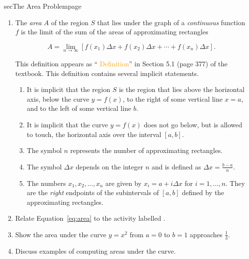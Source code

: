 \documentclass[../main]{subfiles}
\begin{document}
\begin{outline}{sec}{The Area Problem}{page}
\begin{enumerate}
    \item {The \emph{area} \(A\) of the region \(S\) that lies under the graph of a \emph{continuous} function \(f\) is the limit of the sum of the areas of approximating rectangles}
        \begin{mdframed}[style=simple]
          \begin{equation} \label{eq:area}
            A = \lim_{n \to \infty} \left[ f(x_{1}) \Delta x + f(x_{2}) \Delta x + \cdots + f(x_{n}) \Delta x \right].
          \end{equation}
        \end{mdframed}
        This definition appears as ``\textcolor{orange}{ Definition}'' in Section 5.1 (page 377) of the textbook. This definition contains several implicit statements.
      \begin{enumerate}
        \item It is implicit that the region \(S\) is the region that lies above the horizontal axis, below the curve \(y = f(x)\), to the right of some vertical line \(x = a\), and to the left of some vertical line \(b\). 
        \item It is implicit that the curve \(y = f(x)\) does not go below, but is allowed to touch, the horizontal axis over the interval \([a,b]\). %
        \item The symbol \(n\) represents the number of approximating rectangles. %
        \item The symbol \(\Delta x\) depends on the integer \(n\) and is defined as \(\Delta x = \frac{b-a}{n}\). 
        \item The numbers \(x_{1}, x_{2}, \dots, x_{n}\) are given by \(x_{i} = a + i \Delta x\) for \(i = 1, \dots, n\). They are the \emph{right} endpoints of the subintervals of \([a,b]\) defined by the approximating rectangles.
      \end{enumerate}

    \item Relate Equation~\eqref{eq:area} to the activity labelled .
    \item Show the area under the curve \(y = x^{2}\) from \(a = 0\) to \(b = 1\) approaches \(\frac{1}{3}\).
    \item Discuss examples of computing areas under the curve.


\end{enumerate}
\end{outline}
\end{document}
